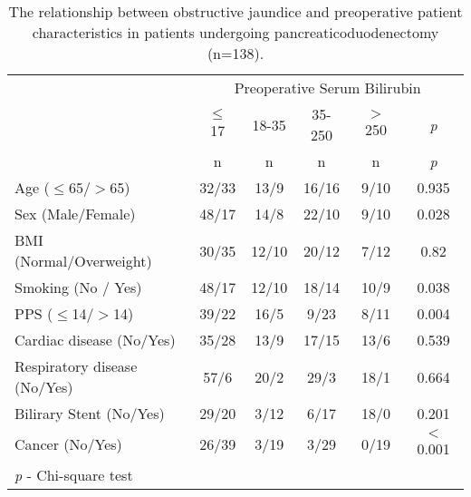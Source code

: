 \begin{table}[p]

\caption{The relationship  between obstructive jaundice and preoperative patient characteristics in patients undergoing pancreaticoduodenectomy (n=138).}
\label{table:cpet_oj_patient}

\centering\renewcommand{\arraystretch}{1.4} %
\setlength{\tabcolsep}{9pt} %


	\begin{tabular}{| l | c c c c c |}
		\hline
		                             & \multicolumn{5}{c|}{Preoperative Serum Bilirubin} \\
		                             & $\leq$ 17 & 18-35 & 35-250 & $>$ 250 & \textit{p} \\
		                             & n         & n     & n      & n       & \textit{p} \\ \hline
		Age ($\leq$65/$>$65)         & 32/33     & 13/9  & 16/16  & 9/10    & 0.935      \\
		Sex (Male/Female)            & 48/17     & 14/8  & 22/10  & 9/10    & 0.028      \\
		BMI (Normal/Overweight)      & 30/35     & 12/10 & 20/12  & 7/12    & 0.82       \\
		Smoking (No / Yes)           & 48/17     & 12/10 & 18/14  & 10/9    & 0.038      \\
		PPS ($\leq$14/$>$14)         & 39/22     & 16/5  & 9/23   & 8/11    & 0.004      \\
		Cardiac disease (No/Yes)     & 35/28     & 13/9  & 17/15  & 13/6    & 0.539      \\
		Respiratory disease (No/Yes) & 57/6      & 20/2  & 29/3   & 18/1    & 0.664      \\
		Bilirary Stent (No/Yes)      & 29/20     & 3/12  & 6/17   & 18/0    & 0.201      \\
		Cancer (No/Yes)              & 26/39     & 3/19  & 3/29   & 0/19    & $<$0.001   \\ \hline
		\multicolumn{6}{l}{\textit{p} - Chi-square test}
	\end{tabular}

\end{table}